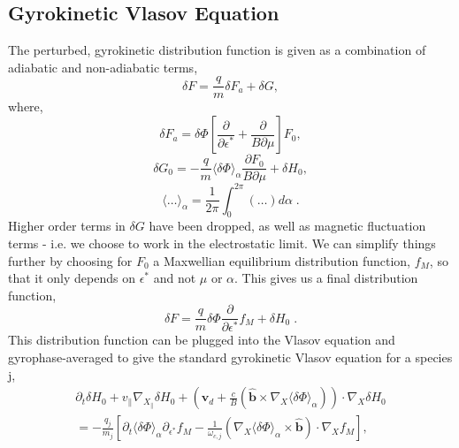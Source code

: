 \documentclass[12pt]{article}
\numberwithin{equation}{subsection}
\begin{document}
\subsection{Gyrokinetic Vlasov Equation}
   \quad The perturbed, gyrokinetic distribution function is given as a combination of adiabatic
and non-adiabatic terms\cite{FriemanChen},
   \begin{equation}
      \delta F = \frac{q}{m}\delta F_a + \delta G,
   \end{equation}
where,    
   \begin{equation}
      \delta F_a = \delta\Phi[\frac{\partial}{\partial\epsilon^*} + \frac{\partial}{B\partial\mu}]F_0, 
   \end{equation}
   \begin{equation}
      \delta G_0 = -\frac{q}{m}\langle\delta\Phi\rangle_\alpha\frac{\partial F_0}{B\partial\mu} + \delta H_0,
   \end{equation}
   \begin{equation}
      \langle\ldots\rangle_\alpha = \frac{1}{2\pi}\int_{0}^{2\pi}(\ldots)d\alpha\;.
   \end{equation}
Higher order terms in $\delta G$ have been dropped, as well as magnetic fluctuation terms - i.e. we choose to
work in the electrostatic limit. We can simplify things further by choosing for $F_0$ a Maxwellian equilibrium
distribution function, $f_M$, so that it only depends on $\epsilon^*$ and not $\mu$ or $\alpha$. This gives us
a final distribution function,
   \begin{equation}
      \delta F = \frac{q}{m}\delta\Phi\frac{\partial}{\partial\epsilon^*}f_M + \delta H_0\;.
   \end{equation}
This distribution function can be plugged into the Vlasov equation and gyrophase-averaged to give the standard gyrokinetic Vlasov
equation for a species j\cite{FriemanChen},
   \begin{equation}
   \begin{aligned}
        \partial_t\delta H_0 + v_\parallel\nabla_{X_\parallel}\delta H_0 +
        (\bm{v}_d + \frac{c}{B}(\bm{\hat{b}}\times\nabla_X\langle\delta\Phi\rangle_\alpha))\cdot\nabla_X\delta H_0 \\
      = -\frac{q_j}{m_j}[\partial_t\langle\delta\Phi\rangle_\alpha\partial_{\epsilon^*} f_M
        -\frac{1}{\omega_{c,j}}(\nabla_X\langle\delta\Phi\rangle_\alpha\times\bm{\hat{b}})\cdot\nabla_X f_M],
   \end{aligned}
   \end{equation}
\end{document}

